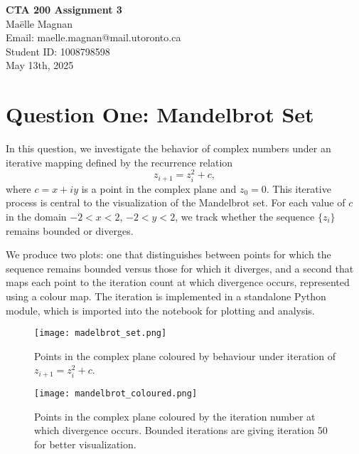 \documentclass[10pt]{article}
\begin{document}
\begin{titlepage}
    \centering
    {\Huge \textbf{CTA 200 Assignment 3}} \\[2cm] %
    
    {\large Maëlle Magnan} \\[0.5cm] %
    Email: maelle.magnan@mail.utoronto.ca \\[0.5cm] %
    Student ID: 1008798598 \\[2cm] %

    {\large May 13th, 2025} \\[3cm] %

\end{titlepage}




\section*{Question One: Mandelbrot Set}

In this question, we investigate the behavior of complex numbers under an iterative mapping defined by the recurrence relation
\[
z_{i+1} = z_i^2 + c,
\]
where \( c = x + iy \) is a point in the complex plane and \( z_0 = 0 \). This iterative process is central to the visualization of the Mandelbrot set. For each value of \( c \) in the domain \( -2 < x < 2 \), \( -2 < y < 2 \), we track whether the sequence \( \{z_i\} \) remains bounded or diverges. 

We produce two plots: one that distinguishes between points for which the sequence remains bounded versus those for which it diverges, and a second that maps each point to the iteration count at which divergence occurs, represented using a colour map. The iteration is implemented in a standalone Python module, which is imported into the notebook for plotting and analysis.

\begin{figure}[H]
    \centering
    \texttt{[image: madelbrot\_set.png]}
    \caption{Points in the complex plane coloured by behaviour under iteration of \( z_{i+1} = z_i^2 + c \). }
    \label{fig:bounded_diverging}
\end{figure} 

\begin{figure}[H]
    \centering
    \texttt{[image: mandelbrot\_coloured.png]}
    \caption{Points in the complex plane coloured by the iteration number at which divergence occurs. Bounded iterations are giving iteration 50 for better visualization.}
    \label{fig:divergence_iterations}
\end{figure}
\end{document}
